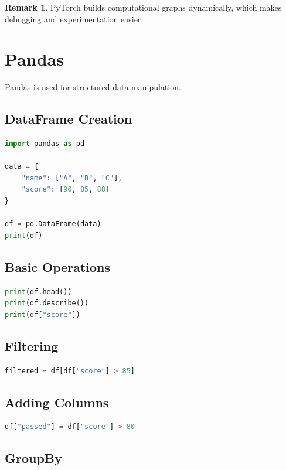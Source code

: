 \documentclass[12pt,oneside]{book}
\numberwithin{equation}{section}
\theoremstyle{definition}
\newtheorem{remark}{Remark}[section]
\theoremstyle{plain}
\theoremstyle{remark}
\begin{document}
\begin{remark}
PyTorch builds computational graphs dynamically, which makes debugging and experimentation easier.
\end{remark}

\section{Pandas}

Pandas is used for structured data manipulation.

\subsection{DataFrame Creation}

\begin{lstlisting}[language=Python]
import pandas as pd

data = {
    "name": ["A", "B", "C"],
    "score": [90, 85, 88]
}

df = pd.DataFrame(data)
print(df)
\end{lstlisting}

\subsection{Basic Operations}

\begin{lstlisting}[language=Python]
print(df.head())
print(df.describe())
print(df["score"])
\end{lstlisting}

\subsection{Filtering}

\begin{lstlisting}[language=Python]
filtered = df[df["score"] > 85]
\end{lstlisting}

\subsection{Adding Columns}

\begin{lstlisting}[language=Python]
df["passed"] = df["score"] > 80
\end{lstlisting}

\subsection{GroupBy}
\end{document}
